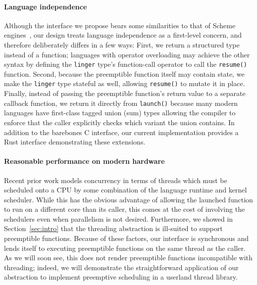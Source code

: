 \paragraph{Language independence}
Although the interface we propose bears some similarities to that of Scheme
engines~\cite{haynes:iucs1984}, our design treats language independence as a
first-level concern, and therefore deliberately differs in a few ways:  First, we
return a structured type instead of a function; languages with operator overloading
may achieve the other syntax by defining the \texttt{linger} type's function-call
operator to call the \texttt{resume()} function.  Second, because the preemptible
function itself may contain state, we make the \texttt{linger} type stateful as well,
allowing \texttt{resume()} to mutate it in place.  Finally, instead of passing the
preemptible function's return value to a separate callback function, we return it
directly from \texttt{launch()} because many modern languages have first-class tagged
union (sum) types allowing the compiler to enforce that the caller explicitly checks
which variant the union contains.  In addition to the barebones C interface, our
current implementation provides a Rust interface demonstrating these extensions.

\paragraph{Reasonable performance on modern hardware}
Recent prior work models concurrency in terms of threads which must be scheduled onto
a CPU by some combination of the language runtime and kernel scheduler.  While this
has the obvious advantage of allowing the launched function to run on a different
core than its caller, this comes at the cost of involving the schedulers even when
parallelism is not desired.  Furthermore, we showed in Section~\ref{sec:intro} that
the threading abstraction is ill-suited to support preemptible functions.  Because of
these factors, our interface is synchronous and lends itself to executing preemptible
functions on the same thread as the caller.  As we will soon see, this does not
render
preemptible functions incompatible with threading; indeed, we will demonstrate the
straightforward application of our abstraction to implement preemptive scheduling in
a userland thread library.

